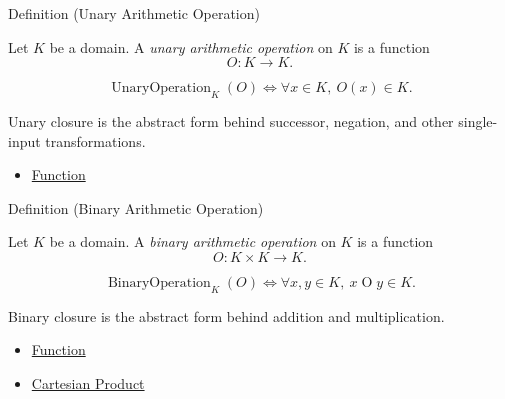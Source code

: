 \begin{definitionbox}{Definition (Unary Arithmetic Operation)}
\begin{definition}
\label{def:unary-arithmetic-operation}
Let $K$ be a domain. A \emph{unary arithmetic operation} on $K$ is a function
\[
O:K\to K.
\]
\end{definition}

\begin{remark*}
\[
\operatorname{UnaryOperation}_K(O)
\Longleftrightarrow
\forall x\in K,\ O(x)\in K.
\]
\end{remark*}

\begin{remark*}[Interpretation]
Unary closure is the abstract form behind successor, negation, and other
single-input transformations.
\end{remark*}

\begin{dependencies}
\begin{itemize}
  \item \hyperref[def:function]{Function}
\end{itemize}
\end{dependencies}
\end{definitionbox}

\begin{definitionbox}{Definition (Binary Arithmetic Operation)}
\begin{definition}
\label{def:binary-arithmetic-operation}
Let $K$ be a domain. A \emph{binary arithmetic operation} on $K$ is a function
\[
O:K\times K\to K.
\]
\end{definition}

\begin{remark*}
\[
\operatorname{BinaryOperation}_K(O)
\Longleftrightarrow
\forall x,y\in K,\ x\mathbin{O}y\in K.
\]
\end{remark*}

\begin{remark*}[Interpretation]
Binary closure is the abstract form behind addition and multiplication.
\end{remark*}

\begin{dependencies}
\begin{itemize}
  \item \hyperref[def:function]{Function}
  \item \hyperref[def:cartesian-product-rel]{Cartesian Product}
\end{itemize}
\end{dependencies}
\end{definitionbox}

